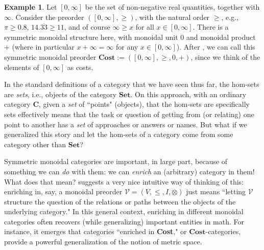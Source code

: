 \documentclass[a4paper]{book}
\theoremstyle{definition}
\newtheorem{example}{Example}[section]
\theoremstyle{definition}
\theoremstyle{definition}
\theoremstyle{theorem}
\theoremstyle{definition}
\begin{document}
\begin{example}
	Let $[0,\infty]$ be the set of non-negative real quantities, together with $\infty$. Consider the preorder $([0, \infty], \geq)$, with the natural order $\geq$, e.g., $\pi \geq 0.8$, $14.\overline{33} \geq 11$, and of course $\infty \geq x$ for all $x \in [0, \infty]$. There is a symmetric monoidal structure here, with monoidal unit $0$ and monoidal product $+$ (where in particular $x + \infty = \infty$ for any $x \in [0, \infty]$). After \cite{fong_seven_2018}, we can call this symmetric monoidal preorder $\textbf{Cost} := ([0,\infty], \geq, 0, +)$, since we think of the elements of $[0, \infty]$ as costs. 
\end{example} 
In the standard definitions of a category that we have seen thus far, the hom-sets are \textit{sets}, i.e., objects of the category $\textbf{Set}$. On this approach, with an ordinary category $\textbf{C}$, given a \textit{set} of ``points" (objects), that the hom-sets are specifically sets effectively means that the task or question of getting from (or relating) one point to another has a \textit{set} of approaches or answers or names. But what if we generalized this story and let the hom-sets of a category come from some category other than $\textbf{Set}$?  \par  
Symmetric monoidal categories are important, in large part, because of something we can \textit{do} with them: we can \textit{enrich} an (arbitrary) category in them! What does that mean? \cite{fong_seven_2018} suggests a very nice intuitive way of thinking of this: enriching in, say, a monoidal preorder $\mathcal{V} = (V, \leq, I, \otimes)$ just means ``letting $\mathcal{V}$ structure the question of the relations or paths between the objects of the underlying category." In this general context, enriching in different monoidal categories often recovers (while generalizing) important entities in math. For instance, it emerges that categories ``enriched in \textbf{Cost}," or  $\textbf{Cost}$-categories, provide a powerful generalization of the notion of metric space.
\end{document}
